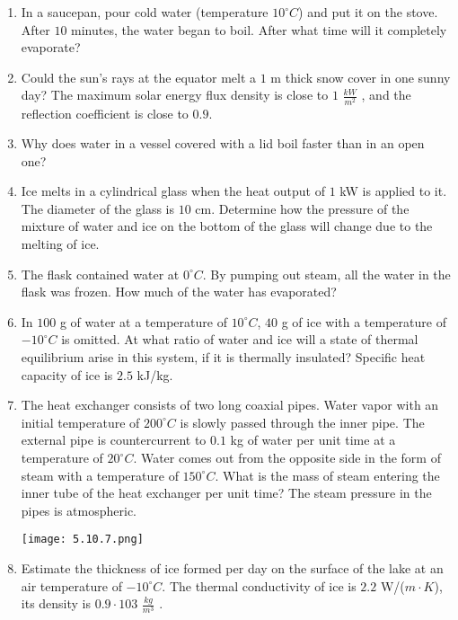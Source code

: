 \documentclass{article}
\begin{document}
\begin{enumerate}[label=5.10.\arabic*]


\item In a saucepan, pour cold water (temperature $10^\circ C$) and put it on the stove. After $10$ minutes, the water began to boil. After what time will it completely evaporate?

\item Could the sun's rays at the equator melt a $1$ m thick snow cover in one sunny day? The maximum solar energy flux density is close to $1$ $\frac{kW}{m^2}$ , and the reflection coefficient is close to $0.9$.

\item Why does water in a vessel covered with a lid boil faster than in an open one?

\item Ice melts in a cylindrical glass when the heat output of $1$ kW is applied to it. The diameter of the glass is $10$ cm. Determine how the pressure of the mixture of water and ice on the bottom of the glass will change due to the melting of ice.

\item The flask contained water at $0^\circ C$. By pumping out steam, all the water in the flask was frozen. How much of the water has evaporated?

\item In $100$ g of water at a temperature of $10^\circ C$, $40$ g of ice with a temperature of $-10^\circ C$ is omitted. At what ratio of water and ice will a state of thermal equilibrium arise in this system, if it is thermally insulated? Specific heat capacity of ice is $2.5$ kJ/kg.

\item The heat exchanger consists of two long coaxial pipes. Water vapor with an initial temperature of $200^\circ C$ is slowly passed through the inner pipe. The external pipe is countercurrent to $0.1$ kg of water per unit time at a temperature of $20^\circ C$. Water comes out from the opposite side in the form of steam with a temperature of $150^\circ C$. What is the mass of steam entering the inner tube of the heat exchanger per unit time? The steam pressure in the pipes is atmospheric.

\begin{center}
    \texttt{[image: 5.10.7.png]}
\end{center}

\item Estimate the thickness of ice formed per day on the surface of the lake at an air temperature of $-10^\circ C$. The thermal conductivity of ice is $2.2$ W/($m \cdot K$), its density is $0.9 \cdot 103$ $\frac{kg}{m^3}$ .


\end{enumerate}
\end{document}
